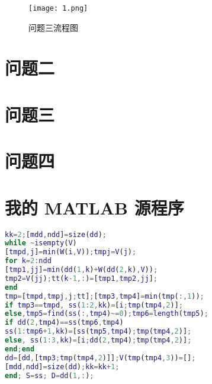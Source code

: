 \documentclass[bwprint]{gmcmthesis}
\begin{document}
\begin{figure}[!h]
\centering
\texttt{[image: 1.png]}
\caption{问题三流程图}
\end{figure}
\section{问题二}
\section{问题三}
\section{问题四}







\newpage
\appendix
\section{我的 MATLAB 源程序}
\begin{lstlisting}[language=MATLAB]%设置不同语言即可。
kk=2;[mdd,ndd]=size(dd);
while ~isempty(V)
[tmpd,j]=min(W(i,V));tmpj=V(j);
for k=2:ndd
[tmp1,jj]=min(dd(1,k)+W(dd(2,k),V));
tmp2=V(jj);tt(k-1,:)=[tmp1,tmp2,jj];
end
tmp=[tmpd,tmpj,j;tt];[tmp3,tmp4]=min(tmp(:,1));
if tmp3==tmpd, ss(1:2,kk)=[i;tmp(tmp4,2)];
else,tmp5=find(ss(:,tmp4)~=0);tmp6=length(tmp5);
if dd(2,tmp4)==ss(tmp6,tmp4)
ss(1:tmp6+1,kk)=[ss(tmp5,tmp4);tmp(tmp4,2)];
else, ss(1:3,kk)=[i;dd(2,tmp4);tmp(tmp4,2)];
end;end
dd=[dd,[tmp3;tmp(tmp4,2)]];V(tmp(tmp4,3))=[];
[mdd,ndd]=size(dd);kk=kk+1;
end; S=ss; D=dd(1,:);


 \end{lstlisting}
\end{document}
